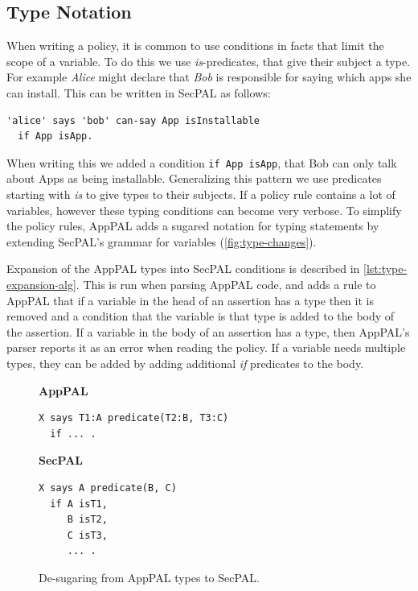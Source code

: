 \documentclass[thesis.tex]{subfiles}
\begin{document}
\subsection{Type Notation}
\label{ssec:types}

When writing a policy, it is common to use conditions in facts that
limit the scope of a variable.  To do this we use
\emph{is}-predicates, that give their subject a type.  For example
\emph{Alice} might declare that \emph{Bob} is responsible for saying
which apps she can install.  This can be written in SecPAL as follows:
\begin{lstlisting}
'alice' says 'bob' can-say App isInstallable
  if App isApp.
\end{lstlisting}
When writing this we added a condition \lstinline{if App isApp}, that
Bob can only talk about Apps as being installable.  Generalizing this
pattern we use predicates starting with \emph{is} to give types to
their subjects.  If a policy rule contains a lot of variables, however
these typing conditions can become very verbose.  To simplify the
policy rules, AppPAL adds a sugared notation for typing statements by
extending SecPAL's grammar for variables (\autoref{fig:type-changes}).

Expansion of the AppPAL types into SecPAL conditions is described in
\autoref{lst:type-expansion-alg}.  This is run when parsing AppPAL code,
and adds a rule to AppPAL that if a variable in the head of an
assertion has a type then it is removed and a condition that the
variable is that type is added to the body of the assertion.  If a
variable in the body of an assertion has a type, then AppPAL's parser
reports it as an error when reading the policy.  If a variable needs
multiple types, they can be added by adding additional \emph{if}
predicates to the body.

\begin{figure}\centering\noindent\sffamily\footnotesize
\begin{minipage}[t]{0.50\textwidth}
  \noindent
  \textbf{AppPAL}
  \begin{lstlisting}
X says T1:A predicate(T2:B, T3:C) 
  if ... .
\end{lstlisting}
\end{minipage}
\hfill
\begin{minipage}[t]{0.40\textwidth}
  \noindent
  \textbf{SecPAL}
\begin{lstlisting}
X says A predicate(B, C) 
  if A isT1, 
     B isT2, 
     C isT3, 
     ... .
\end{lstlisting}
\end{minipage}
  \caption{De-sugaring from AppPAL types to SecPAL.}
  \label{lst:type-expansion}
\end{figure}
\end{document}
